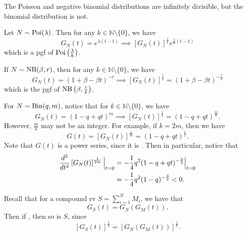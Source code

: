 \documentclass[notoc,notitlepage]{tufte-book}
\begin{document}
\begin{eg}
  The Poisson and negative binomial distributions are infinitely divisible, but the binomial distribution is not.
\end{eg}

\begin{solution}
  Let $N \sim \operatorname{Poi}(\lambda)$. Then for any $k \in \mathbb{N} \setminus \{ 0 \}$, we have
  \begin{equation*}
    G_N(t) = e^{\lambda( t - 1 )} \implies \left[ G_N(t) \right]^{\frac{1}{k}} e^{\frac{\lambda}{k} ( t - 1 )}
  \end{equation*}
  which is a pgf of $\operatorname{Poi} \left( \frac{\lambda}{k} \right)$.

  If $N \sim \operatorname{NB}(\beta, r)$, then for any $k \in \mathbb{N} \setminus \{ 0 \}$, we have
  \begin{equation*}
    G_N(t) = (1 + \beta - \beta t)^{-r} \implies \left[ G_N(t) \right]^{\frac{1}{k}} = ( 1 + \beta - \beta t )^{-\frac{r}{k}}
  \end{equation*}
  which is the pgf of $\operatorname{NB}\left(\beta, \frac{r}{k} \right)$.

  For $N \sim \operatorname{Bin}(q, m)$, notice that for $k \in \mathbb{N} \setminus \{ 0 \}$, we have
  \begin{equation*}
    G_N(t) = (1 - q + qt)^m \implies \left[ G_N(t) \right]^{\frac{1}{k}} = ( 1 - q + qt )^{\frac{m}{k}}.
  \end{equation*}
  However, $\frac{m}{k}$ may not be an integer. For example, if $k = 2m$, then we have
  \begin{equation*}
    G(t) = \left[ G_N(t) \right]^{\frac{1}{m}} = ( 1 - q + qt )^{\frac{1}{2}}.
  \end{equation*}
  Note that $G(t)$ is a power series, since it is . Then in particular, notice that
  \begin{align*}
    \frac{d^2}{dt^2} \left[ G_N(t) \right]^{\frac{1}{2m}}\Big|_{t = 0}^{} 
      &= - \frac{1}{4} q^2 ( 1 - q + qt )^{-\frac{3}{2}} \Big|_{t = 0}^{} \\
      &= - \frac{1}{4} q^2 ( 1 - q )^{-\frac{3}{2}} < 0.
  \end{align*}
\end{solution}

\begin{eg}
  Recall that for a compound rv $S = \sum_{i=1}^{N} M_i$, we have that
  \begin{equation*}
    G_S(t) = G_N( G_M(t) ).
  \end{equation*}
  Then if , then so is $S$, since
  \begin{equation*}
    \left[ G_S(t) \right]^{\frac{1}{k}} = \left[ G_N( G_M(t) ) \right]^{\frac{1}{k}}.
  \end{equation*}
\end{eg}
\end{document}
